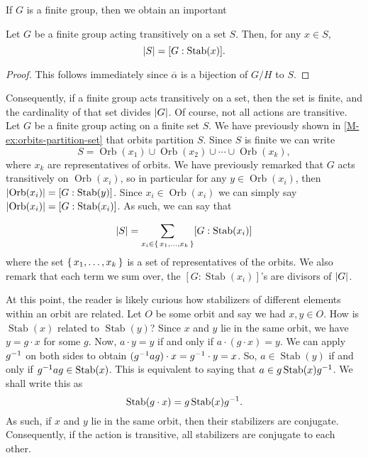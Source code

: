 \documentclass[./main.tex]{subfiles}
\begin{document}
If $G$ is a finite group, then we obtain an important 
\begin{corollary}
    Let $G$ be a finite group acting transitively on a set $S$. Then, for any $x \in S$, 
    \[
        \abs S = [G: \operatorname{Stab}(x)].
    \]
\end{corollary}
\begin{proof}
    This follows immediately since $\overline \alpha$ is a bijection of $G/H$ to $S$.
\end{proof}
Consequently, if a finite group acts transitively on a set, then the set is
finite, and the cardinality of that set divides $\abs G$. Of course, not all
actions are transitive. Let $G$ be a finite group acting on a finite set $S$. We
have previously shown in \cref{M-ex:orbits-partition-set} that orbits partition
$S$. Since $S$ is finite we can write 
\begin{equation}
\label{eqn:partition-of-set-into-orbits}
    S = \operatorname{Orb}(x_1) \cup \operatorname{Orb}(x_2) \cup \cdots \cup \operatorname{Orb}(x_k),
\end{equation}
where $x_k$ are representatives of orbits. We have previously remarked that $G$
acts transitively on $\operatorname{Orb}(x_i)$, so in particular for any $y \in
\operatorname{Orb}(x_i)$, then $\abs{\operatorname{Orb}(x_i)} = [G:
\operatorname{Stab}(y)]$. Since $x_i \in \operatorname{Orb}(x_i)$ we can simply
say $\abs{\operatorname{Orb}(x_i)} = [G:\operatorname{Stab}(x_i)]$.
As such, we can say that 

\begin{equation}
\label{eqn:enumeration-of-elements-of-finite-set-under-action}
    \abs S = \sum_{x_i \in \set{x_1, \dots, x_k}} [G:\operatorname{Stab}(x_i)]
\end{equation}
where the set $\set{x_1, \dots, x_k}$ is a set of representatives of the orbits.
We also remark that each term we sum over, the $[G:\operatorname{Stab}(x_i)]$'s
are divisors of $\abs G$. 

At this point, the reader is likely curious how stabilizers of different
elements within an orbit are related. Let $O$ be some orbit and say we had $x, y
\in O$. How is $\operatorname{Stab}(x)$ related to $\operatorname{Stab}(y)$?
Since $x$ and $y$ lie in the same orbit, we have $y = g \cdot x$ for some $g$.
Now, $a \cdot y = y$ if and only if $a \cdot (g \cdot x) = y$. We can apply
$g^{-1}$ on both sides to obtain $(g^{-1} a g) \cdot x = g^{-1} \cdot y = x$. So,
$a \in \operatorname{Stab}(y)$ if and only if $g^{-1} a g \in
\operatorname{Stab}(x)$. This is equivalent to saying that $a \in
g\operatorname{Stab}(x)g^{-1}$. We shall write this as 
\begin{equation}
\label{eqn:stabilizers-are-conjugate-within-same-orbit}
    \operatorname{Stab}(g \cdot x) = g\operatorname{Stab}(x)g^{-1}.
\end{equation}
As such, if $x$ and $y$ lie in the same orbit, then their stabilizers are
conjugate. Consequently, if the action is transitive, all stabilizers are
conjugate to each other.
\end{document}
